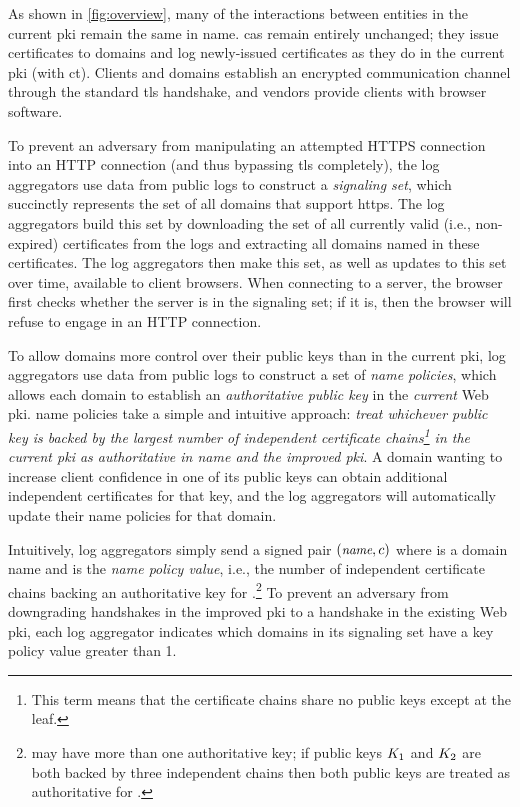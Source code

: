 As shown in \autoref{fig:overview}, many of the interactions between entities in
the current \ac{pki} remain the same in \ac{name}. \acp{ca} remain entirely unchanged;
they issue certificates
to domains and log newly-issued certificates as they do in the current \ac{pki}
(with \ac{ct}). Clients and domains establish an encrypted communication channel
through the standard \ac{tls} handshake, and vendors provide clients with browser
software.

To prevent an adversary from manipulating an attempted HTTPS connection into
an HTTP connection (and thus bypassing \ac{tls}
completely), the log aggregators use data from public logs to construct a
\emph{signaling set}, which succinctly represents the set of all domains that
support \ac{https}. The log aggregators build this set by downloading the set of
all currently valid (i.e., non-expired) certificates from the logs and
extracting all domains named in these certificates. The log aggregators then
make this set, as well as updates to this set over time, available to client
browsers.  When connecting to a server, the browser first checks whether
the server is in the signaling set; if it is, then the browser will refuse
to engage in an HTTP connection.

To allow domains more control over their public keys than in the current
\ac{pki}, log aggregators use data from public logs to construct a set of
\emph{\ac{name} policies}, which allows each domain to establish an
\emph{authoritative public key} in the \emph{current} Web \ac{pki}. \ac{name}
policies take a simple and intuitive approach: \emph{treat whichever public key
  is backed by the largest number of independent certificate
  chains\footnote{This term means that the certificate chains share no public
keys except at the leaf.} in the current \ac{pki} as authoritative in \ac{name}
and the improved \ac{pki}}. A domain wanting to increase client confidence in
one of its public keys can obtain additional independent certificates for that
key, and the log aggregators will automatically update their \ac{name} policies
for that domain.

Intuitively, log aggregators simply send a signed pair $(\small{\emph{name}}, c)$
where \hostname is a domain name and \policy is the \emph{\ac{name} policy
  value}, i.e., the number of independent certificate chains backing an authoritative
  key for \hostname.\footnote{\hostname may have more than one authoritative
  key; if public keys $K_1$ and $K_2$ are both backed by three independent
chains then both public keys are treated as authoritative
for \hostname.} To prevent an adversary from downgrading handshakes in the
improved \ac{pki} to a handshake in the existing Web \ac{pki}, each log
aggregator indicates which domains in its signaling set have a key policy value
greater than 1.

